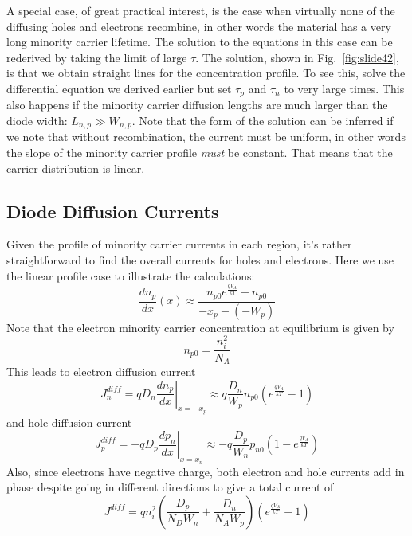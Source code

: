 A special case, of great practical interest, is the case when virtually none of the diffusing holes and electrons recombine, in other words the material has a very long minority carrier lifetime.  The solution to the equations in this case can be rederived by taking the limit of large $\tau$.  The solution, shown in Fig.~\ref{fig:slide42}, is that we obtain straight lines for the concentration profile.
To see this, solve the differential equation we derived earlier but set $\tau_p$ and $\tau_n$ to very large times.  This also happens if the minority carrier diffusion lengths are much larger than the diode width: $ {L_{n,p}} \gg {W_{n,p}} $.  Note that the form of the solution can be inferred if we note that without recombination, the current must be uniform, in other words the slope of the minority carrier profile \emph{must} be constant. That means that the carrier distribution is linear.
\subsection{Diode Diffusion Currents}
Given the profile of minority carrier currents in each region, it's rather straightforward to find the overall currents for holes and electrons.  Here we use the linear profile case to illustrate the calculations:
    \begin{equation}
        \frac{{d{n_p}}}{{dx}}(x) \approx \frac{{{n_{p0}}{e^{\frac{{q{V_A}}}{{kT}}}} - {n_{p0}}}}{{ - {x_p} - ( - {W_p})}}
    \end{equation}
Note that the electron minority carrier concentration at equilibrium is given by
    \begin{equation}
        {n_{p0}} = \frac{{n_i^2}}{{{N_A}}}
    \end{equation}
This leads to electron diffusion current
    \begin{equation}
        J_n^{diff} = q{D_n}{\left. {\frac{{d{n_p}}}{{dx}}} \right|_{x =  - {x_p}}} \approx q\frac{{{D_n}}}{{{W_p}}}{n_{p0}}\left( {{e^{\frac{{q{V_A}}}{{kT}}}} - 1} \right)
    \end{equation}
and hole diffusion current
    \begin{equation}
        J_p^{diff} =  - q{D_p}{\left. {\frac{{d{p_n}}}{{dx}}} \right|_{x = {x_n}}} \approx  - q\frac{{{D_p}}}{{{W_n}}}{p_{n0}}\left( {1 - {e^{\frac{{q{V_A}}}{{kT}}}}} \right)
    \end{equation}
Also, since electrons have negative charge, both electron and hole currents add in phase despite going in different directions to give a total current of
    \begin{equation}
        J_{}^{diff} = qn_i^2\left( {\frac{{{D_p}}}{{{N_D}{W_n}}} + \frac{{{D_n}}}{{{N_A}{W_p}}}} \right)\left( {{e^{\frac{{q{V_A}}}{{kT}}}} - 1} \right)
    \end{equation}
